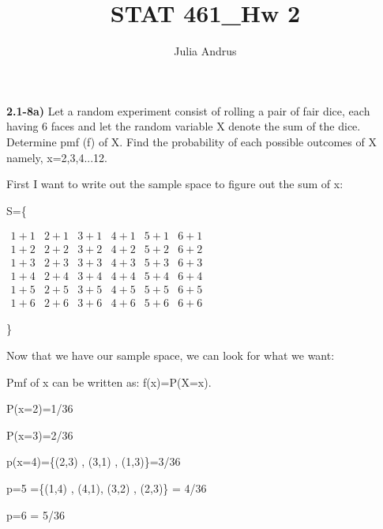 \documentclass{article}
\title{STAT 461\_Hw 2}
\author{Julia Andrus}
\date{}
\begin{document}
\maketitle 
\textbf{2.1-8a)} Let a random experiment consist of rolling a pair of fair dice, each having 6 faces and let the random variable X denote the sum of the dice. Determine pmf (f) of X. Find the probability of each possible outcomes of X namely, x=2,3,4...12. 

\vspace{2mm}

First I want to write out the sample space to figure out the sum of x:

\vspace{2mm}

S=\{

$\begin{matrix}
1+1 & 2+1 & 3+1 & 4+1 & 5+1 & 6+1 \\
1+2 & 2+2 & 3+2 & 4+2 & 5+2 & 6+2 \\
1+3 & 2+3 & 3+3 & 4+3 & 5+3 & 6+3 \\
1+4 & 2+4 & 3+4 & 4+4 & 5+4 & 6+4 \\
1+5 & 2+5 & 3+5 & 4+5 & 5+5 & 6+5 \\
1+6 & 2+6 & 3+6 & 4+6 & 5+6 & 6+6 
\end{matrix}$

\}


Now that we have our sample space, we can look for what we want:

Pmf of x can be written as: f(x)=P(X=x).

\vspace{2mm}

P(x=2)=1/36

\vspace{2mm}

P(x=3)=2/36

\vspace{2mm}

p(x=4)=\{(2,3) , (3,1) , (1,3)\}=3/36

\vspace{2mm}

p=5 =\{(1,4) , (4,1), (3,2) , (2,3)\} = 4/36

\vspace{2mm}

p=6 = 5/36

\vspace{2mm}
\end{document}
